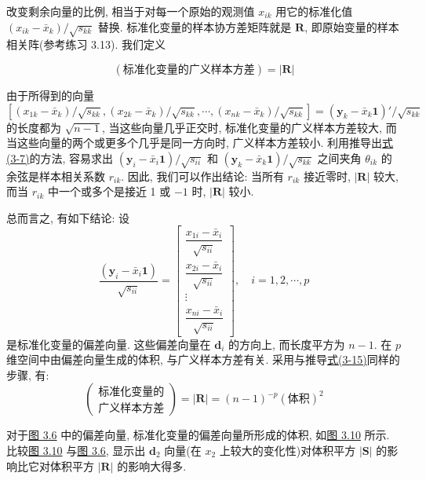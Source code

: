 
改变剩余向量的比例, 相当于对每一个原始的观测值 $x_{ik}$ 用它的标准化值 $(x_{ik}-\bar{x}_{k})/\sqrt{s_{kk}}$ 替换. 标准化变量的样本协方差矩阵就是 $\mathbf{R}$, 即原始变量的样本相关阵(参考练习 3.13). 我们定义
\begin{mvbox}
\label{eq:3-19}
\begin{equation}
(\text{标准化变量的广义样本方差})=|\mathbf{R}| \tag{3-19}
\end{equation}
\end{mvbox}
由于所得到的向量
\[
[(x_{1k}-\bar{x}_{k})/\sqrt{s_{kk}},(x_{2k}-\bar{x}_{k})/\sqrt{s_{kk}},\cdots,(x_{nk}-\bar{x}_{k})/\sqrt{s_{kk}}]=(\mathbf{y}_{k}-\bar{x}_{k}\mathbf{1})'/\sqrt{s_{kk}}
\]
的长度都为 $\sqrt{n-1}$, 当这些向量几乎正交时, 标准化变量的广义样本方差较大, 而当这些向量的两个或更多个几乎是同一方向时, 广义样本方差较小. 利用推导出\hyperref[eq:3-7]{式(3-7)}的方法, 容易求出 $(\mathbf{y}_{i}-\bar{x}_{i}\mathbf{1})/\sqrt{s_{ii}}$ 和 $(\mathbf{y}_{k}-\bar{x}_{k}\mathbf{1})/\sqrt{s_{kk}}$ 之间夹角 $\theta_{ik}$ 的余弦是样本相关系数 $r_{ik}$. 因此, 我们可以作出结论: 当所有 $r_{ik}$ 接近零时, $|\mathbf{R}|$ 较大, 而当 $r_{ik}$ 中一个或多个是接近 1 或 $-1$ 时, $|\mathbf{R}|$ 较小.

总而言之, 有如下结论: 设
\[
\frac{(\mathbf{y}_{i}-\bar{x}_{i}\mathbf{1})}{\sqrt{s_{ii}}}=\begin{bmatrix}\dfrac{x_{1i}-\bar{x}_{i}}{\sqrt{s_{ii}}}\\\dfrac{x_{2i}-\bar{x}_{i}}{\sqrt{s_{ii}}}\\\vdots\\\dfrac{x_{ni}-\bar{x}_{i}}{\sqrt{s_{ii}}}\end{bmatrix},\quad i=1,2,\cdots,p
\]
是标准化变量的偏差向量. 这些偏差向量在 $\mathbf{d}_{i}$ 的方向上, 而长度平方为 $n-1$. 在 $p$ 维空间中由偏差向量生成的体积, 与广义样本方差有关. 采用与推导\hyperref[eq:3-15]{式(3-15)}同样的步骤, 有:
\label{eq:3-20}
\begin{equation}
\left(\begin{matrix}\text{标准化变量的}\\\text{广义样本方差}\end{matrix}\right)=|\mathbf{R}|=(n-1)^{-p}(\text{体积})^{2} \tag{3-20}
\end{equation}

对于\hyperref[fig:3.6]{图 3.6} 中的偏差向量, 标准化变量的偏差向量所形成的体积, 如\hyperref[fig:3.10]{图 3.10} 所示. 比较\hyperref[fig:3.10]{图 3.10} 与\hyperref[fig:3.6]{图 3.6}, 显示出 $\mathbf{d}_{2}$ 向量(在 $x_{2}$ 上较大的变化性)对体积平方 $|\mathbf{S}|$ 的影响比它对体积平方 $|\mathbf{R}|$ 的影响大得多.

